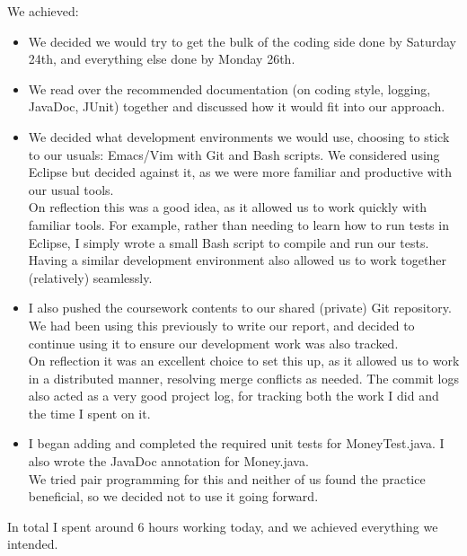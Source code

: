 \documentclass[titlepage, 12pt]{extarticle}
\begin{document}
We achieved:
\begin{itemize}
\item  We decided we would try to get the bulk of the coding side done by Saturday 24th, and everything else done by Monday 26th.
\item We read over the recommended documentation (on coding style, logging, JavaDoc, JUnit) together and discussed how it would fit into our approach.
\item We decided what development environments we would use, choosing to stick to our usuals: Emacs/Vim with Git and Bash scripts. We considered using Eclipse but decided against it, as we were more familiar and productive with our usual tools. \\ On reflection this was a good idea, as it allowed us to work quickly with familiar tools. For example, rather than needing to learn how to run tests in Eclipse, I simply wrote a small Bash script to compile and run our tests. Having a similar development environment also allowed us to work together (relatively) seamlessly.
\item I also pushed the coursework contents to our shared (private) Git repository. We had been using this previously to write our report, and decided to continue using it to ensure our development work was also tracked. \\ On reflection it was an excellent choice to set this up, as it allowed us to work in a distributed manner, resolving merge conflicts as needed. The commit logs also acted as a very good project log, for tracking both the work I did and the time I spent on it.
\item I began adding and completed the required unit tests for MoneyTest.java. I also wrote the JavaDoc annotation for Money.java. \\ We tried pair programming for this and neither of us found the practice beneficial, so we decided not to use it going forward. 
\end{itemize}

In total I spent around 6 hours working today, and we achieved everything we intended. 
\end{document}
